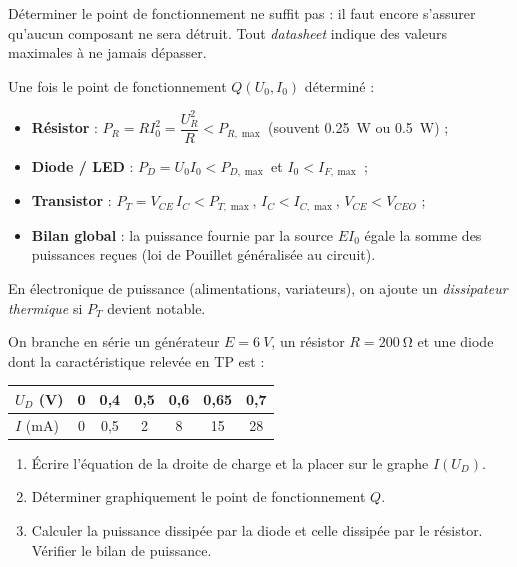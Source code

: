 \documentclass[11pt]{article}
\begin{document}
Déterminer le point de fonctionnement ne suffit pas : il faut encore s'assurer qu'aucun composant ne sera détruit. Tout \emph{datasheet} indique des valeurs maximales à ne jamais dépasser.

\begin{aretenir}
Une fois le point de fonctionnement $Q(U_0, I_0)$ déterminé :
\begin{itemize}
\item \textbf{Résistor} : $P_R = R I_0^2 = \dfrac{U_R^2}{R} < P_{R,\max}$ (souvent \SI{0,25}{W} ou \SI{0,5}{W}) ;
\item \textbf{Diode / LED} : $P_D = U_0 I_0 < P_{D,\max}$ et $I_0 < I_{F,\max}$ ;
\item \textbf{Transistor} : $P_T = V_{CE}\, I_C < P_{T,\max}$, $I_C < I_{C,\max}$, $V_{CE} < V_{CEO}$ ;
\item \textbf{Bilan global} : la puissance fournie par la source $E I_0$ égale la somme des puissances reçues (loi de Pouillet généralisée au circuit).
\end{itemize}
En électronique de puissance (alimentations, variateurs), on ajoute un \emph{dissipateur thermique} si $P_T$ devient notable.
\end{aretenir}

\begin{exercice}
On branche en série un générateur $E = \SI{6}{V}$, un résistor $R = \SI{200}{\ohm}$ et une diode dont la caractéristique relevée en TP est :
\begin{center}
\begin{tabular}{|l|c|c|c|c|c|c|}
\hline
\rowcolor{popblueL} $U_D$ (V) & 0 & 0{,}4 & 0{,}5 & 0{,}6 & 0{,}65 & 0{,}7 \\
\hline
$I$ (mA) & 0 & 0{,}5 & 2 & 8 & 15 & 28 \\
\hline
\end{tabular}
\end{center}
\begin{enumerate}
\item Écrire l'équation de la droite de charge et la placer sur le graphe $I(U_D)$.
\item Déterminer graphiquement le point de fonctionnement $Q$.
\item Calculer la puissance dissipée par la diode et celle dissipée par le résistor. Vérifier le bilan de puissance.
\end{enumerate}
\end{exercice}
\end{document}
